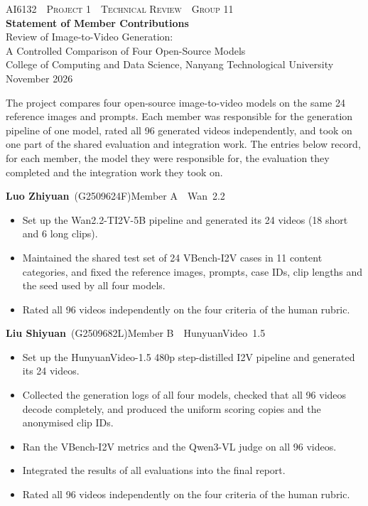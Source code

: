 \documentclass[11pt,a4paper]{article}
\newcommand{\member}[4]{%
  \par\addvspace{9pt plus 2pt}%
  \textbf{#2} \,(#3)\hfill\textcolor{accent}{Member #1 \,\textperiodcentered\, #4}\par\nobreak\vspace{-1pt}}
\begin{document}
\begin{center}
  {\small\scshape AI6132 \,\textperiodcentered\, Project 1 \,\textperiodcentered\, Technical Review \,\textperiodcentered\, Group 11}\\[10pt]
  {\LARGE\bfseries Statement of Member Contributions}\\[8pt]
  {\normalsize Review of Image-to-Video Generation:\\
   A Controlled Comparison of Four Open-Source Models}\\[8pt]
  {\small College of Computing and Data Science, Nanyang Technological University \,\textperiodcentered\, November 2026}
\end{center}
\vspace{2pt}

The project compares four open-source image-to-video models on the same 24 reference images and prompts. Each member was responsible for the generation pipeline of one model, rated all 96 generated videos independently, and took on one part of the shared evaluation and integration work. The entries below record, for each member, the model they were responsible for, the evaluation they completed and the integration work they took on.

\member{A}{Luo Zhiyuan}{G2509624F}{Wan~2.2}
\begin{itemize}
  \item Set up the Wan2.2-TI2V-5B pipeline and generated its 24 videos (18 short and 6 long clips).
  \item Maintained the shared test set of 24 VBench-I2V cases in 11 content categories, and fixed the reference images, prompts, case IDs, clip lengths and the seed used by all four models.
  \item Rated all 96 videos independently on the four criteria of the human rubric.
\end{itemize}

\member{B}{Liu Shiyuan}{G2509682L}{HunyuanVideo~1.5}
\begin{itemize}
  \item Set up the HunyuanVideo-1.5 480p step-distilled I2V pipeline and generated its 24 videos.
  \item Collected the generation logs of all four models, checked that all 96 videos decode completely, and produced the uniform scoring copies and the anonymised clip IDs.
  \item Ran the VBench-I2V metrics and the Qwen3-VL judge on all 96 videos.
  \item Integrated the results of all evaluations into the final report.
  \item Rated all 96 videos independently on the four criteria of the human rubric.
\end{itemize}
\end{document}
